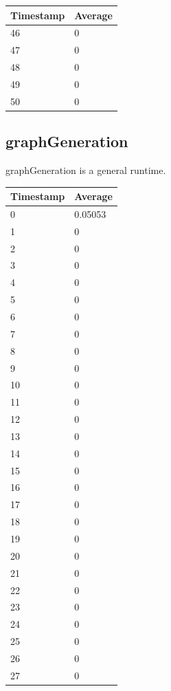\begin{tabular}{|l||l|}
\hline
	\textbf{Timestamp} & \textbf{Average} \\ \hline
	46 & 0 \\ \hline
	47 & 0 \\ \hline
	48 & 0 \\ \hline
	49 & 0 \\ \hline
	50 & 0 \\ \hline
\end{tabular}

\subsection{graphGeneration}
graphGeneration is a general runtime.

%
%
\begin{tabular}{|l||l|}
\hline
	\textbf{Timestamp} & \textbf{Average} \\ \hline
	0 & 0.05053 \\ \hline
	1 & 0 \\ \hline
	2 & 0 \\ \hline
	3 & 0 \\ \hline
	4 & 0 \\ \hline
	5 & 0 \\ \hline
	6 & 0 \\ \hline
	7 & 0 \\ \hline
	8 & 0 \\ \hline
	9 & 0 \\ \hline
	10 & 0 \\ \hline
	11 & 0 \\ \hline
	12 & 0 \\ \hline
	13 & 0 \\ \hline
	14 & 0 \\ \hline
	15 & 0 \\ \hline
	16 & 0 \\ \hline
	17 & 0 \\ \hline
	18 & 0 \\ \hline
	19 & 0 \\ \hline
	20 & 0 \\ \hline
	21 & 0 \\ \hline
	22 & 0 \\ \hline
	23 & 0 \\ \hline
	24 & 0 \\ \hline
	25 & 0 \\ \hline
	26 & 0 \\ \hline
	27 & 0 \\ \hline

\end{tabular}
